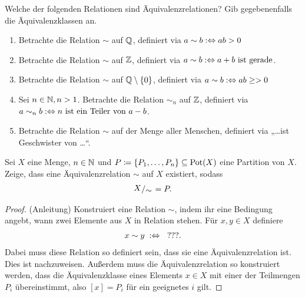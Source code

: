\begin{aufg}

  Welche der folgenden Relationen sind Äquivalenzrelationen? Gib
  gegebenenfalls die Äquivalenzklassen an.
  \begin{enumerate}
    \item Betrachte die Relation $\sim$ auf $\mathbb Q$, definiert via $a \sim b
      :\Leftrightarrow ab>0$
    \item Betrachte die Relation $\sim$ auf $\mathbb Z$, definiert via $a \sim b :\Leftrightarrow a+b
      \text{ ist gerade}$. 
    \item Betrachte die Relation $\sim$ auf $\mathbb Q\setminus\{0\}$, definiert
      via $a \sim b :\Leftrightarrow ab\geq >0$
    \item Sei $n\in\mathbb N, n>1$. Betrachte die Relation $\sim_{n}$ auf $\mathbb Z$,
      definiert via\\
      $a \sim_{n} b :\Leftrightarrow n \text{ ist ein Teiler von } a-b$.
    \item Betrachte die Relation $\sim$ auf der Menge aller Menschen, definiert via „\dots ist
      Geschwister von \dots“. 
  \end{enumerate}
  
\end{aufg}


\begin{aufg}

  Sei $X$ eine Menge, $n\in\mathbb N$ und $P \coloneqq \{ P_{1}, \dots, P_{n} \} \subseteq
  \operatorname{Pot}(X)$ eine Partition von $X$. Zeige, dass eine Äquivalenzrelation
  $\sim$ auf $X$ existiert, sodass
  \begin{align*}
    \quotspace{X}{\sim} = P.
  \end{align*}

  \begin{proof}
    (Anleitung) Konstruiert eine Relation $\sim$, indem ihr eine Bedingung
    angebt, wann zwei Elemente aus $X$ in Relation stehen. Für $x,y\in X$
    definiere
    \begin{align*}
      x\sim y \; :\Leftrightarrow\; \text{ ???}.
    \end{align*}
    Dabei muss diese Relation so definiert sein, dass sie eine
    Äquivalenzrelation ist. Dies ist nachzuweisen. Außerdem muss die
    Äquivalenzrelation so konstruiert werden, dass die Äquivalenzklasse
    eines Elements $x\in X$ mit einer der Teilmengen $P_{i}$ übereinstimmt,
    also $[x] = P_{i}$ für ein geeignetes $i$ gilt.
  \end{proof}
  
\end{aufg}


